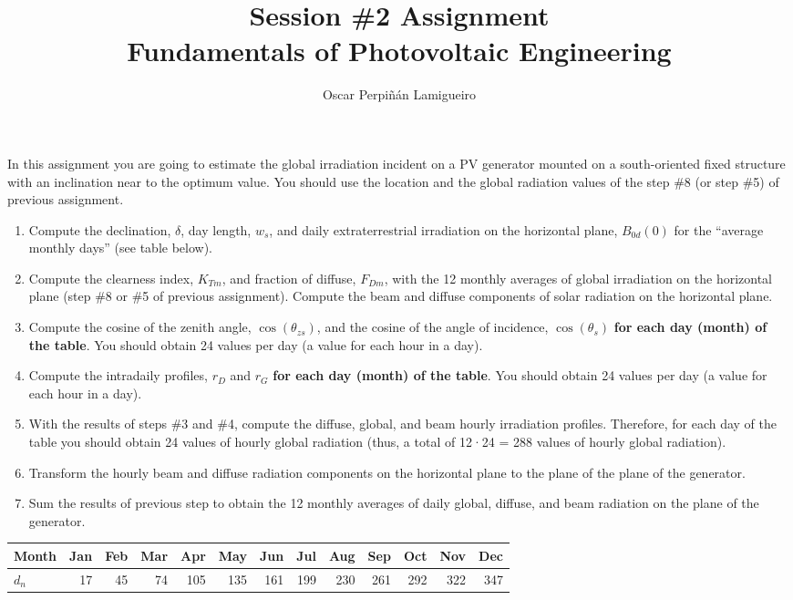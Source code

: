 \documentclass[11pt]{article}
\author{Oscar Perpiñán Lamigueiro}
\date{}
\title{Session \#2 Assignment\\\medskip
\large Fundamentals of Photovoltaic Engineering}
\begin{document}
\maketitle
In this assignment you are going to estimate the global irradiation incident on a PV generator mounted on a south-oriented fixed structure with an inclination near to the optimum value. You should use the location and the global radiation values of the step \#8 (or step \#5) of previous assignment.

\begin{enumerate}
\item Compute the declination, \(\delta\), day length, \(w_s\), and daily extraterrestrial irradiation on the horizontal plane, \(B_{0d}(0)\) for the ``average monthly days'' (see table below).

\item Compute the clearness index, \(K_{Tm}\), and fraction of diffuse, \(F_{Dm}\), with the 12 monthly averages of global irradiation on the horizontal plane (step \#8 or \#5 of previous assignment). Compute the beam and diffuse components of solar radiation on the horizontal plane.

\item Compute the cosine of the zenith angle, \(\cos(\theta_{zs})\), and the cosine of the angle of incidence, \(\cos(\theta_s)\) \textbf{for each day (month) of the table}. You should obtain 24 values per day (a value for each hour in a day).

\item Compute the intradaily profiles, \(r_D\) and \(r_G\) \textbf{for each day (month) of the table}. You should obtain 24 values per day (a value for each hour in a day).

\item With the results of steps \#3 and \#4, compute the diffuse, global, and beam hourly irradiation profiles. Therefore, for each day of the table you should obtain 24 values of hourly global radiation (thus, a total of 12·24 = 288 values of hourly global radiation).

\item Transform the hourly beam and diffuse radiation components on the horizontal plane to the plane of the plane of the generator.

\item Sum the results of previous step to obtain the 12 monthly averages of daily global, diffuse, and beam radiation on the plane of the generator.
\end{enumerate}


\begin{center}
\begin{tabular}{lrrrrrrrrrrrr}
Month & Jan & Feb & Mar & Apr & May & Jun & Jul & Aug & Sep & Oct & Nov & Dec\\
\hline
\(d_n\) & 17 & 45 & 74 & 105 & 135 & 161 & 199 & 230 & 261 & 292 & 322 & 347\\
\end{tabular}
\end{center}
\end{document}
